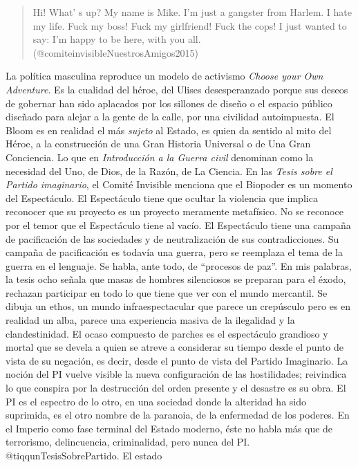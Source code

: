 \documentclass[
]{article}
\begin{document}
\begin{quote}
Hi! What' s up? My name is Mike. I'm just a gangster from Harlem. I hate
my life. Fuck my boss! Fuck my girlfriend! Fuck the cops! I just wanted
to say: I'm happy to be here, with you all.
(@comiteinvisibleNuestrosAmigos2015)
\end{quote}

La política masculina reproduce un modelo de activismo \emph{Choose your
Own Adventure}. Es la cualidad del héroe, del Ulises desesperanzado
porque sus deseos de gobernar han sido aplacados por los sillones de
diseño o el espacio público diseñado para alejar a la gente de la calle,
por una civilidad autoimpuesta. El Bloom es en realidad el más
\emph{sujeto} al Estado, es quien da sentido al mito del Héroe, a la
construcción de una Gran Historia Universal o de Una Gran Conciencia. Lo
que en \emph{Introducción a la Guerra civil} denominan como la necesidad
del Uno, de Dios, de la Razón, de La Ciencia. En las \emph{Tesis sobre
el Partido imaginario}, el Comité Invisible menciona que el Biopoder es
un momento del Espectáculo. El Espectáculo tiene que ocultar la
violencia que implica reconocer que su proyecto es un proyecto meramente
metafísico. No se reconoce por el temor que el Espectáculo tiene al
vacío. El Espectáculo tiene una campaña de pacificación de las
sociedades y de neutralización de sus contradicciones. Su campaña de
pacificación es todavía una guerra, pero se reemplaza el tema de la
guerra en el lenguaje. Se habla, ante todo, de ``procesos de paz''. En
mis palabras, la tesis ocho señala que masas de hombres silenciosos se
preparan para el éxodo, rechazan participar en todo lo que tiene que ver
con el mundo mercantil. Se dibuja un ethos, un mundo infraespectacular
que parece un crepúsculo pero es en realidad un alba, parece una
experiencia masiva de la ilegalidad y la clandestinidad. El ocaso
compuesto de parches es el espectáculo grandioso y mortal que se devela
a quien se atreve a considerar su tiempo desde el punto de vista de su
negación, es decir, desde el punto de vista del Partido Imaginario. La
noción del PI vuelve visible la nueva configuración de las hostilidades;
reivindica lo que conspira por la destrucción del orden presente y el
desastre es su obra. El PI es el espectro de lo otro, en una sociedad
donde la alteridad ha sido suprimida, es el otro nombre de la paranoia,
de la enfermedad de los poderes. En el Imperio como fase terminal del
Estado moderno, éste no habla más que de terrorismo, delincuencia,
criminalidad, pero nunca del PI. @tiqqunTesisSobrePartido. El estado
\end{document}
